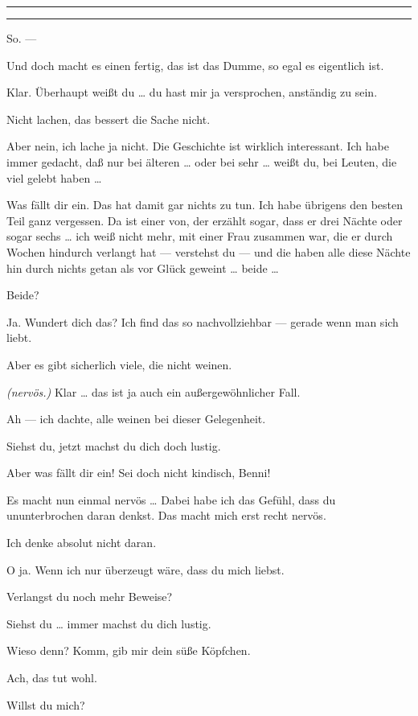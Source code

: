 \documentclass[
	final,
	a4paper,
	ngerman,
	mpinclude = true, %
	twoside = true,
	open = right,
	cleardoublepage = plain,
	DIV = 13,
	BCOR = 1cm,
	titlepage = firstiscover,
	]{scrbook}
\newcommand{\direction}[1]{\textit{(#1)}}
\newenvironment{deletion}{%
		\vspace{0.25\baselineskip}
		\hrule
		\vspace{0.25\baselineskip}
		\color{darkgray}
	}{
		\color{black}
		\vspace{0.25\baselineskip}
		\hrule 
		\vspace{0.25\baselineskip}
	}
\newcommand{\thecharacter}[1]{\textup{\textsc{#1}}\xspace}
\newcommand{\theherr}{\thecharacter{Benjamin}}
\newcommand{\thefrau}{\thecharacter{Emma}}
\newcommand{\character}[1]{\item[#1:]}
\newcommand{\herr}{\character{\theherr}}
\newcommand{\frau}{\character{\thefrau}}
\begin{document}
\begin{play}
\begin{deletion}
	\frau
	\end{deletion}
	So. ---

	\herr
	Und doch macht es einen fertig, das ist das Dumme, so egal es eigentlich ist.

	\frau
	Klar. Überhaupt weißt du \ldots{} du hast mir ja versprochen, anständig zu sein.

	\herr
	Nicht lachen, das bessert die Sache nicht.

	\frau
	Aber nein, ich lache ja nicht. Die Geschichte ist wirklich interessant. Ich habe immer gedacht, daß nur bei älteren \ldots{} oder bei sehr \ldots{} weißt du, bei Leuten, die viel gelebt haben \ldots{}

	\herr
	Was fällt dir ein. Das hat damit gar nichts zu tun. Ich habe übrigens den besten Teil ganz vergessen. Da ist einer von, der erzählt sogar, dass er drei Nächte oder sogar sechs \ldots{} ich weiß nicht mehr, mit einer Frau zusammen war, die er durch Wochen hindurch verlangt hat --- verstehst du --- und die haben alle diese Nächte hin durch nichts getan als vor Glück geweint \ldots{} beide \ldots{}

	\frau
	Beide?

	\herr
	Ja. Wundert dich das? Ich find das so nachvollziehbar --- gerade wenn man sich liebt.

	\frau
	Aber es gibt sicherlich viele, die nicht weinen.

	\herr
	\direction{nervös.} Klar \ldots{} das ist ja auch ein außergewöhnlicher Fall.

	\frau
	Ah --- ich dachte, alle weinen bei dieser Gelegenheit.

	\herr
	Siehst du, jetzt machst du dich doch lustig.

	\frau
	Aber was fällt dir ein! Sei doch nicht kindisch, Benni!

	\herr
	Es macht nun einmal nervös \ldots{} Dabei habe ich das Gefühl, dass du ununterbrochen daran denkst. Das macht mich erst recht nervös.

	\frau
	Ich denke absolut nicht daran.

	\herr
	O ja. Wenn ich nur überzeugt wäre, dass du mich liebst.

	\frau
	Verlangst du noch mehr Beweise?

	\herr
	Siehst du \ldots{} immer machst du dich lustig.

	\frau
	Wieso denn? Komm, gib mir dein süße Köpfchen.

	\herr
	Ach, das tut wohl.

	\frau
	Willst du mich?


\end{play}
\end{document}
